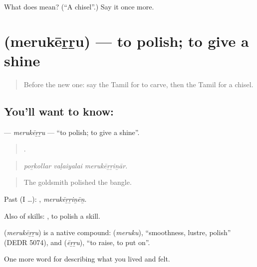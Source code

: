 \begin{tcolorbox}[breakable,colback=teal!4,colframe=teal!35!black,title={Before you move on}]
What does  mean? (\textquotedblleft{}A chisel\textquotedblright{}.) Say it once more.
\end{tcolorbox}
\section[\texorpdfstring{\ta{மெருகேற்று} (merukēṟṟu)}{மெருகேற்று (merukēṟṟu)}]{ (merukēṟṟu) — to polish; to give a shine}

\label{lesson:TA-C537-merukerru}



\begin{quote}
Before the new one: say the Tamil for to carve, then the Tamil for a chisel.
\end{quote}

\subsection*{You'll want to know: }
\textbf{} — \emph{merukēṟṟu} — \textquotedblleft{}to polish; to give a shine\textquotedblright{}.

\begin{quote}
  .
\end{quote}

\begin{quote}
\emph{poṟkollar vaḷaiyalai merukēṟṟiṉār.}
\end{quote}

\begin{quote}
The goldsmith polished the bangle.
\end{quote}

Past (I …): , \emph{merukēṟṟiṉēṉ}.

Also of skills:  , to polish a skill.

\begin{cousinweb}
\textbf{} (\emph{merukēṟṟu}) is a native compound:  (\emph{meruku}), \textquotedblleft{}smoothness, lustre, polish\textquotedblright{} (DEDR 5074), and  (\emph{ēṟṟu}), \textquotedblleft{}to raise, to put on\textquotedblright{}.
\end{cousinweb}

\begin{grammarlens}[title={What you've built}]
One more word for describing what you lived and felt.
\end{grammarlens}

